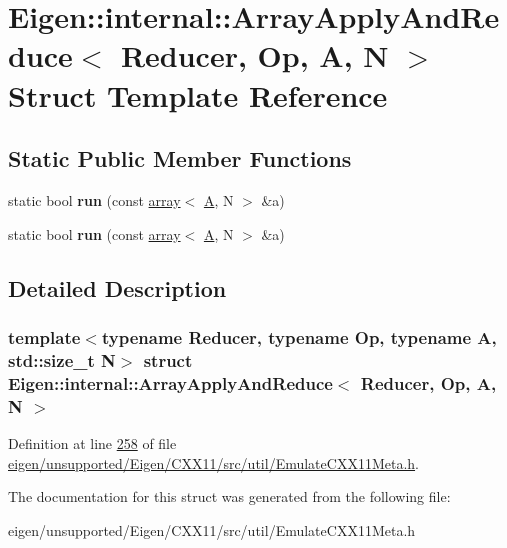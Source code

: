 \hypertarget{struct_eigen_1_1internal_1_1_array_apply_and_reduce}{}\section{Eigen\+:\+:internal\+:\+:Array\+Apply\+And\+Reduce$<$ Reducer, Op, A, N $>$ Struct Template Reference}
\label{struct_eigen_1_1internal_1_1_array_apply_and_reduce}
\subsection*{Static Public Member Functions}
\begin{DoxyCompactItemize}
\item 
\mbox{\label{struct_eigen_1_1internal_1_1_array_apply_and_reduce_a053cdf235cfc2311a2befbe28f863611}} 
static bool {\bfseries run} (const \hyperlink{class_eigen_1_1array}{array}$<$ \hyperlink{group___core___module_class_eigen_1_1_matrix}{A}, N $>$ \&a)
\item 
\mbox{\label{struct_eigen_1_1internal_1_1_array_apply_and_reduce_a053cdf235cfc2311a2befbe28f863611}} 
static bool {\bfseries run} (const \hyperlink{class_eigen_1_1array}{array}$<$ \hyperlink{group___core___module_class_eigen_1_1_matrix}{A}, N $>$ \&a)
\end{DoxyCompactItemize}


\subsection{Detailed Description}
\subsubsection*{template$<$typename Reducer, typename Op, typename A, std\+::size\+\_\+t N$>$\newline
struct Eigen\+::internal\+::\+Array\+Apply\+And\+Reduce$<$ Reducer, Op, A, N $>$}



Definition at line \hyperlink{eigen_2unsupported_2_eigen_2_c_x_x11_2src_2util_2_emulate_c_x_x11_meta_8h_source_l00258}{258} of file \hyperlink{eigen_2unsupported_2_eigen_2_c_x_x11_2src_2util_2_emulate_c_x_x11_meta_8h_source}{eigen/unsupported/\+Eigen/\+C\+X\+X11/src/util/\+Emulate\+C\+X\+X11\+Meta.\+h}.



The documentation for this struct was generated from the following file\+:\begin{DoxyCompactItemize}
\item 
eigen/unsupported/\+Eigen/\+C\+X\+X11/src/util/\+Emulate\+C\+X\+X11\+Meta.\+h\end{DoxyCompactItemize}
